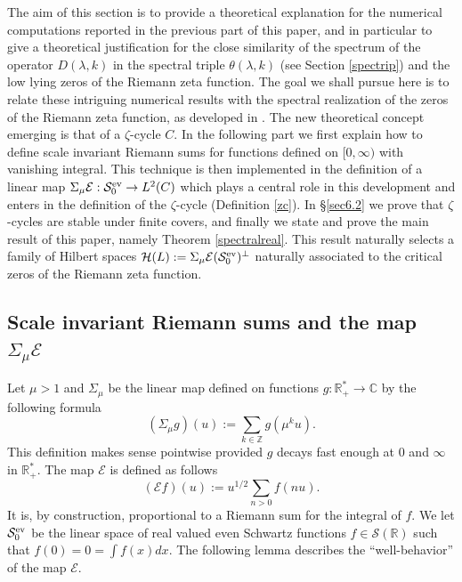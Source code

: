 \documentclass[cupthm]{CUP-JNL-JMJ}
\def\C{{\mathbb C}}
\def\R{{\mathbb R}}
\def\Z{{\mathbb Z}}
\def\cE{{\mathcal E}}
\def\cS{{\mathcal S}}
\def\cH{{\mathcal H}}
\def\sr0{{\cS^{\rm ev}_0}}
\numberwithin{equation}{section}
\theoremstyle{cupplain}
\theoremstyle{cupdefinition}
\theoremstyle{cupremark}
\theoremstyle{cupproof}
\begin{document}
 The aim of this section is  to provide a theoretical explanation for the numerical computations reported in the previous part of this paper, and in particular to give a theoretical justification for the close similarity of the spectrum of the operator $D(\lambda,k)$ in the spectral triple $\theta(\lambda,k)$ (see Section \ref{spectrip}) and the low lying zeros of the Riemann zeta function. The goal we shall pursue here is to relate these intriguing numerical results with the spectral realization   of the zeros of the Riemann zeta function, as developed in \cite{Co-zeta}. The new theoretical concept emerging is that of a $\zeta$-cycle $C$. In the following part we first explain how to define scale invariant Riemann sums for functions defined on $[0,\infty)$ with vanishing integral. This technique is then implemented in the definition of a  linear map $\Sigma_\mu \cE: \sr0\to L^2(C)
$  which plays a central role in this development and enters in the definition of the $\zeta$-cycle  (Definition \ref{zc}). In \S \ref{sec6.2} we prove that $\zeta$-cycles are stable under finite covers, and finally we state and prove the main result of this paper, namely Theorem \ref{spectralreal}. This result naturally selects a  family of Hilbert spaces $\cH(L):=\Sigma_\mu \cE(\sr0)^\perp$ naturally associated to the critical zeros  of the Riemann zeta function.

\subsection{Scale invariant Riemann sums and the map $\Sigma_\mu \cE$ }\label{sectriemannsums}

Let $\mu>1$ and $\Sigma_\mu$ be the linear map defined on functions $g:\R_+^*\to \C$ by the following formula
\begin{equation}\label{sigmap}
	(\Sigma_\mu g)(u):=\sum_{k\in\Z} g(\mu^ku).
\end{equation}
This definition makes sense pointwise provided $g$ decays fast enough at $0$ and $\infty$ in $\R_+^*$. The map $\cE$ is defined as follows 
\begin{equation}\label{mapE}
	(\cE f)(u):=u^{1/2}\sum_{n>0} f(nu).
\end{equation}
It is, by construction, proportional to a Riemann sum for the integral of $f$. \newline
 We let $\sr0$ be the linear space of real valued even Schwartz functions $f\in \cS(\R)$  such that $f(0)=0=\int f(x)dx$.
The following lemma describes the ``well-behavior'' of the map $\cE$.
 
\end{document}
